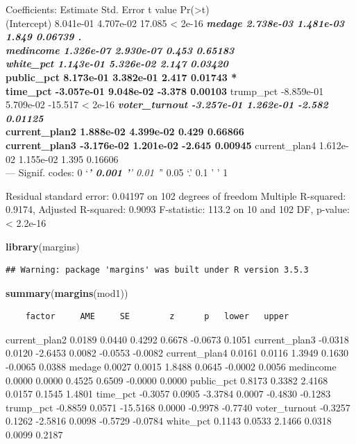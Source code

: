 \documentclass[
]{article}
\newenvironment{Shaded}{\begin{snugshade}}{\end{snugshade}}
\newcommand{\KeywordTok}[1]{\textcolor[rgb]{0.13,0.29,0.53}{\textbf{#1}}}
\newcommand{\NormalTok}[1]{#1}
\begin{document}
Coefficients: Estimate Std. Error t value
Pr(\textgreater\textbar t\textbar)\\
(Intercept) 8.041e-01 4.707e-02 17.085 \textless{} 2e-16 \textbf{\emph{
medage 2.738e-03 1.481e-03 1.849 0.06739 .\\
medincome 1.326e-07 2.930e-07 0.453 0.65183\\
white\_pct 1.143e-01 5.326e-02 2.147 0.03420 }\\
public\_pct 8.173e-01 3.382e-01 2.417 0.01743 *\\
time\_pct -3.057e-01 9.048e-02 -3.378 0.00103 } trump\_pct -8.859e-01
5.709e-02 -15.517 \textless{} 2e-16 \textbf{\emph{ voter\_turnout
-3.257e-01 1.262e-01 -2.582 0.01125 }\\
current\_plan2 1.888e-02 4.399e-02 0.429 0.66866\\
current\_plan3 -3.176e-02 1.201e-02 -2.645 0.00945 } current\_plan4
1.612e-02 1.155e-02 1.395 0.16606\\
--- Signif. codes: 0 `\emph{\textbf{' 0.001 '}' 0.01 '}' 0.05 `.' 0.1 '
' 1

Residual standard error: 0.04197 on 102 degrees of freedom Multiple
R-squared: 0.9174, Adjusted R-squared: 0.9093 F-statistic: 113.2 on 10
and 102 DF, p-value: \textless{} 2.2e-16

\begin{Shaded}
\begin{Highlighting}[]
\KeywordTok{library}\NormalTok{(margins)}
\end{Highlighting}
\end{Shaded}

\begin{verbatim}
## Warning: package 'margins' was built under R version 3.5.3
\end{verbatim}

\begin{Shaded}
\begin{Highlighting}[]
\KeywordTok{summary}\NormalTok{(}\KeywordTok{margins}\NormalTok{(mod1))}
\end{Highlighting}
\end{Shaded}

\begin{verbatim}
    factor     AME     SE        z      p   lower   upper
\end{verbatim}

current\_plan2 0.0189 0.0440 0.4292 0.6678 -0.0673 0.1051 current\_plan3
-0.0318 0.0120 -2.6453 0.0082 -0.0553 -0.0082 current\_plan4 0.0161
0.0116 1.3949 0.1630 -0.0065 0.0388 medage 0.0027 0.0015 1.8488 0.0645
-0.0002 0.0056 medincome 0.0000 0.0000 0.4525 0.6509 -0.0000 0.0000
public\_pct 0.8173 0.3382 2.4168 0.0157 0.1545 1.4801 time\_pct -0.3057
0.0905 -3.3784 0.0007 -0.4830 -0.1283 trump\_pct -0.8859 0.0571 -15.5168
0.0000 -0.9978 -0.7740 voter\_turnout -0.3257 0.1262 -2.5816 0.0098
-0.5729 -0.0784 white\_pct 0.1143 0.0533 2.1466 0.0318 0.0099 0.2187
\end{document}
